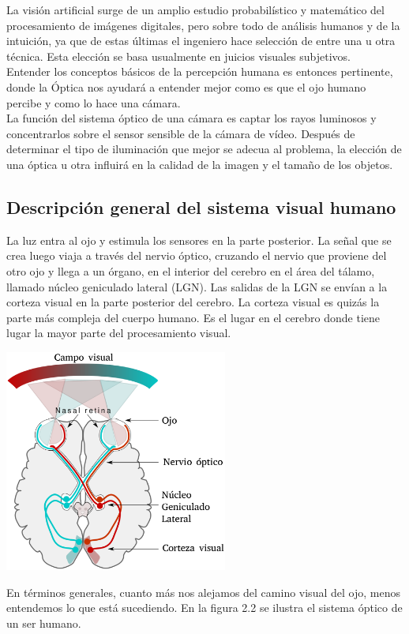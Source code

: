 La visión artificial surge de un amplio estudio probabilístico y matemático del
procesamiento de imágenes digitales, pero sobre todo de análisis humanos y de la
intuición, ya que de estas últimas el ingeniero hace selección de entre una u otra
técnica. Esta elección se basa usualmente en juicios visuales subjetivos.\\
Entender los conceptos básicos de la percepción humana es entonces pertinente, donde
la Óptica nos ayudará a entender mejor como es que el ojo humano percibe y como lo
hace una cámara. \\
La función del sistema óptico de una cámara es captar los rayos luminosos y concentrarlos
sobre el sensor sensible de la cámara de vídeo. Después de determinar el tipo de
iluminación que mejor se adecua al problema, la elección de una óptica u otra influirá
en la calidad de la imagen y el tamaño de los objetos.

\subsection{Descripción general del sistema visual humano}
La luz entra al ojo y estimula los sensores en la parte posterior.
La señal que se crea luego viaja a través del nervio óptico, cruzando el
nervio que proviene del otro ojo y llega a un órgano, en el interior del
cerebro en el área del tálamo, llamado núcleo geniculado lateral (LGN).
Las salidas de la LGN se envían a la corteza visual en la parte posterior del cerebro.
La corteza visual es quizás la parte más compleja del cuerpo humano. Es el lugar en el
cerebro donde tiene lugar la mayor parte del procesamiento visual.\cite{Book:Anil2008}
\begin{center}
	\includegraphics[width=0.55\textwidth]{Contenido/Cuerpo/Capitulo2/Fig1_1.eps}
	\label{fig:MarcoTeorico:Fig2}
\end{center}
En términos generales, cuanto más nos alejamos del camino visual del ojo, menos
entendemos lo que está sucediendo.
En la figura 2.2 se ilustra el sistema óptico de un ser humano.

